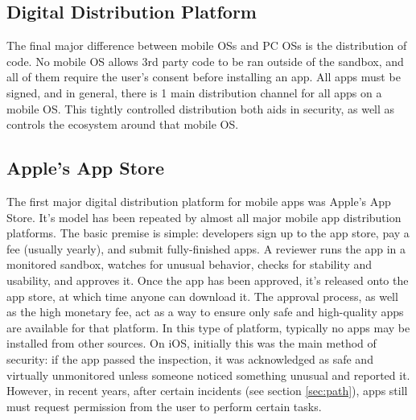 
\subsection{Digital Distribution Platform}

The final major difference between mobile OSs and PC OSs is the distribution of code. No mobile OS allows 3rd party code to be ran outside of the sandbox, and all of them require the user's consent before installing an app. All apps must be signed, and in general, there is 1 main distribution channel for all apps on a mobile OS. This tightly controlled distribution both aids in security, as well as controls the ecosystem around that mobile OS.

\subsection{Apple's App Store}
The first major digital distribution platform for mobile apps was Apple's App Store\citep{AppleAppStore}. It's model has been repeated by almost all major mobile app distribution platforms. The basic premise is simple: developers sign up to the app store, pay a fee (usually yearly), and submit fully-finished apps. A reviewer runs the app in a monitored sandbox, watches for unusual behavior, checks for stability and usability, and approves it. Once the app has been approved, it's released onto the app store, at which time anyone can download it. The approval process, as well as the high monetary fee, act as a way to ensure only safe and high-quality apps are available for that platform. In this type of platform, typically no apps may be installed from other sources. On iOS, initially this was the main method of security: if the app passed the inspection, it was acknowledged as safe and virtually unmonitored unless someone noticed something unusual and reported it. However, in recent years, after certain incidents (see section \ref{sec:path}), apps still must request permission from the user to perform certain tasks.

